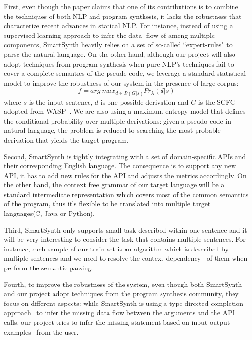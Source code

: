 \documentclass[10pt]{article}
\begin{document}
First, even though the paper claims that one of its contributions is to combine the
techniques of both NLP and program synthesis, it lacks the robustness that characterize
recent advances in statical NLP. For instance, instead of using a supervised learning 
approach to infer the data- flow of among multiple components, SmartSynth heavily 
relies on a set of so-called ``expert-rules" to parse the natural language. On the 
other hand, although our project will also adopt techniques from program synthesis when 
pure NLP's techniques fail to cover a complete semantics of the pseudo-code, we 
leverage a standard statistical model to improve the 
robustness of our system in the presence of large corpus: 
\[
f = arg \ max_{d\in D(G|s)} Pr_{\lambda}(d|s)
\]
where $s$ is the input sentence, $d$ is one possible derivation and $G$ is the 
SCFG adopted from WASP~\cite{wasp}.
We are also using a maximum-entropy model that defines the conditional probability 
over multiple derivations: given a pseudo-code in natural language, the problem is reduced to searching the most probable derivation that yields the target program.


Second, SmartSynth is tightly integrating with a set of domain-specific APIs and their
corresponding English language. The consequence is to support any new API, it has to 
add new rules for the API and adjusts the metrics accordingly. On the other hand, the 
context free grammar of our target language will be a standard intermediate 
representation which covers most of the common semantics of the program, thus it's 
flexible to be translated into multiple target languages(C, Java or Python).

Third, SmartSynth only supports small task described within one 
sentence and it will be very interesting to consider the task that contains multiple 
sentences. For instance, each sample of our train set is an algorithm which is
described by multiple sentences and we need to resolve the context 
dependency~\cite{dep} of them when perform the semantic parsing.

Fourth, to improve the robustness of the system, even though both SmartSynth 
and our project adopt techniques from the program synthesis community, 
they focus on different aspects: while SmartSynth is using a type-directed 
completion approach~\cite{typebase} to infer the missing data flow between
the arguments and the API calls, our project tries to infer the missing 
statement based on input-output examples~\cite{input} from the user.
\end{document}
